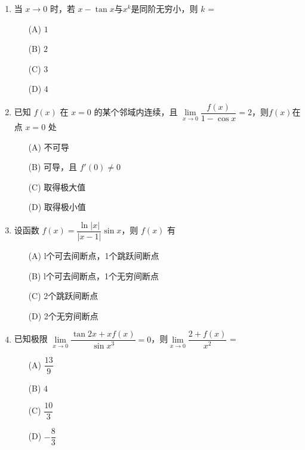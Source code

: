 \documentclass[a4paper,12pt]{article}
\begin{document}
\begin{enumerate}
    \item 当 \( x \to 0 \) 时，若 \( x - \tan x \)与\( x^k \)是同阶无穷小，则 \( k \) = 
    \begin{multicols}{4}
        \begin{itemize}
            \item[(A)] \( 1 \)
            \item[(B)] \( 2 \)
            \item[(C)] \( 3 \)
            \item[(D)] \( 4 \)
        \end{itemize}
    \end{multicols}
    

    \item 已知 \( f(x) \) 在 \( x=0 \) 的某个邻域内连续，且 \( \underset{x \to 0}{\lim} \dfrac{f(x)}{1 - \cos x} = 2 \)，则\( f(x) \)在点 \( x=0 \) 处
    \begin{multicols}{2}
        \begin{itemize}
            \item[(A)] 不可导
            \item[(B)] 可导，且 \( f'(0) \neq 0 \)
            \item[(C)] 取得极大值
            \item[(D)] 取得极小值
        \end{itemize}
    \end{multicols}

    \item 设函数 \( f(x) = \dfrac{\ln \left| x \right| }{\left| x - 1 \right|}\sin x \)，则 \( f(x) \) 有
    \begin{multicols}{2}
        \begin{itemize}
            \item[(A)] l个可去间断点，1个跳跃间断点
            \item[(B)] l个可去间断点，1个无穷间断点
            \item[(C)] 2个跳跃间断点
            \item[(D)] 2个无穷间断点
        \end{itemize}
    \end{multicols}

    \item 已知极限 \( \underset{x \to 0}{\lim} \dfrac{\tan{2x}+xf(x)}{\sin{x^3}}=0 \)，则\( \underset{x \to 0}{\lim}\dfrac{2+f(x)}{x^2} \) = 
    \begin{multicols}{4}
        \begin{itemize}
            \item[(A)] \( \dfrac{13}{9} \)
            \item[(B)] \( 4 \)
            \item[(C)] \( \dfrac{10}{3} \)
            \item[(D)] \( -\dfrac{8}{3} \)
        \end{itemize}
    \end{multicols}



\end{enumerate}
\end{document}
